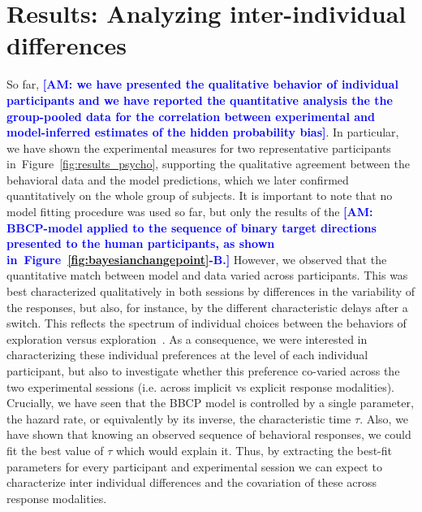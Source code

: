 \documentclass[12pt,english]{article}%
\newcommand{\citep}[1]{\parencite{#1}}
\newcommand{\seeFig}[1]{Figure~\ref{fig:#1}}
\newcommand{\AM}[1]{\textbf{\textcolor{blue}{[AM: #1]}}}
\begin{document}
\section{Results: Analyzing inter-individual differences}
\label{sec:inter}
So far, \AM{we have presented the qualitative behavior of individual participants and we have reported the quantitative analysis the the group-pooled data for the correlation between experimental and model-inferred estimates of the hidden probability bias}.
In particular, we have shown the experimental measures for two representative participants in~\seeFig{results_psycho},
supporting the qualitative agreement between the behavioral data and the model predictions,
which we later confirmed quantitatively on the whole group of subjects.
It is important to note that no model fitting procedure was used so far,
but only the results of the \AM{BBCP-model applied to the sequence of binary target directions presented to the human participants, as shown in~\seeFig{bayesianchangepoint}-B.}
However, we observed that the quantitative match between model and data varied across participants.
This was best characterized qualitatively in both sessions by differences
in the variability of the responses, but also, for instance,
by the different characteristic delays after a switch.
This reflects the spectrum of individual choices
between the behaviors of exploration versus exploration~\citep{Behrens07}.
As a consequence, we were interested in characterizing these individual preferences
at the level of each individual participant, but also to investigate
whether this preference co-varied across the two experimental sessions (i.e. across implicit vs explicit response modalities).
Crucially, we have seen that the BBCP model is controlled by a single parameter,
the hazard rate, or equivalently by its inverse, the characteristic time $\tau$.
Also, we have shown that knowing an observed sequence of behavioral responses,
we could fit the best value of $\tau$ which would explain it.
Thus, by extracting the best-fit parameters for every participant and experimental session
we can expect to characterize inter individual differences and the covariation of these across response modalities.
\end{document}
